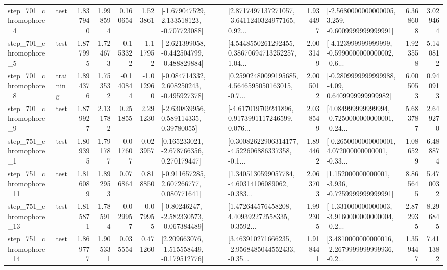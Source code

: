 \begin{tabular}{llrrrrllrlrr}
   step\_701\_chromophore\_4 &      test &      1.837940 &    1.998594 &      0.160654 &  1.523861 &   [-1.679047529, 2.133518123, -0.707723088] &  [2.8717497137271057, -3.6411240324977165, 0.92... &       1.934497 &  [-2.5680000000000005, 3.259, -0.6009999999999991] &            6.368608 &          3.029464 \\
   step\_701\_chromophore\_5 &      test &      1.877995 &    1.724673 &     -0.153322 & -1.117952 &  [-2.621399058, -0.442504799, -0.488829884] &  [4.5448550261292455, 0.38670694713252257, 1.04... &       2.003149 &  [-4.123999999999999, -0.5990000000000002, -0.6... &            1.923558 &          5.140812 \\
   step\_701\_chromophore\_8 &  training &      1.894376 &    1.753532 &     -0.140844 & -1.012960 &   [-0.084714332, 2.608250243, -0.495927378] &  [0.25902480099195685, 4.5646595050163015, -0.7... &       2.005012 &   [-0.2809999999999988, -4.09, 0.6409999999999982] &            6.005053 &          0.940913 \\
   step\_701\_chromophore\_9 &      test &      1.879927 &    2.131782 &      0.251855 &  2.291230 &     [-2.630839956, 0.589114335, 0.39780055] &  [-4.617019709241896, 0.9173991117246599, 0.076... &       2.038549 &  [4.084999999999994, -0.7250000000000001, -0.24... &            5.683787 &          2.649270 \\
   step\_751\_chromophore\_1 &      test &      1.809395 &    1.791787 &     -0.017607 &  0.023957 &    [0.165233021, -2.678766356, 0.270179447] &  [0.30082622906314177, -4.522606886337358, -0.1... &       1.894462 &  [-0.2650000000000001, 4.072000000000001, -0.33... &            1.086529 &          6.488874 \\
  step\_751\_chromophore\_11 &      test &      1.816089 &    1.892953 &      0.076864 &  0.818850 &    [-0.911657285, 2.607266777, 0.080771641] &  [1.3405130599057784, -4.60314106089062, -0.383... &       2.063703 &   [1.152000000000001, -3.936, -0.7259999999999991] &            8.865645 &          5.470032 \\
  step\_751\_chromophore\_13 &      test &      1.815871 &    1.785914 &     -0.029957 & -0.079955 &   [-0.80246247, -2.582330573, -0.067384489] &  [1.472644576458208, 4.409392272558335, -0.3592... &       1.992305 &  [-1.331000000000003, -3.9160000000000004, -0.2... &            2.872935 &          8.296845 \\
  step\_751\_chromophore\_14 &      test &      1.869777 &    1.905331 &      0.035554 &  0.471260 &   [2.209663076, -1.515558449, -0.179512776] &  [3.463910271666235, -2.9568485044552433, -0.35... &       1.918441 &  [3.4810000000000016, -2.2679999999999936, -0.2... &            1.359447 &          7.411382 \\

\end{tabular}
